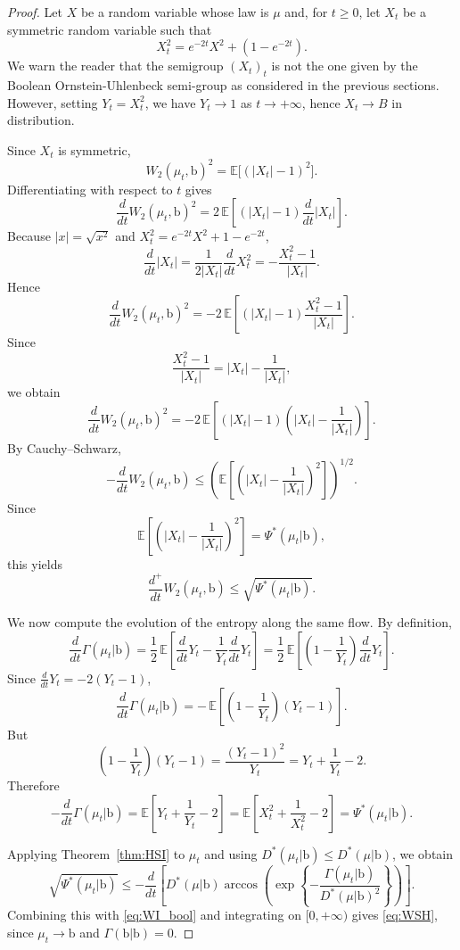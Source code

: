 \documentclass[10pt, reqno]{amsart}
\numberwithin{equation}{section}
\theoremstyle{definition}
\theoremstyle{plain}
\theoremstyle{remark}
\newcommand{\E}{\mathbb{E}}
\newcommand{\1}{\mathbbm{1}}
\begin{document}
\begin{proof}
Let $X$ be a random variable whose law is $\mu$ and, for $t\ge 0$, let $X_t$ be a symmetric random variable such that
\[
X_t^2 = e^{-2t}X^2+(1-e^{-2t}).
\]
We warn the reader that the semigroup $(X_t)_t$ is not the one given by the Boolean Ornstein-Uhlenbeck semi-group as considered in the previous sections.
However,  setting $Y_t=X_t^2$, we have $Y_t\to 1$ as $t\to+\infty$, hence
$X_t\to B$ in distribution.

Since $X_t$ is symmetric,
\[
W_2(\mu_t,\mathbb{\mathrm{b}})^2
=\E\big[(|X_t|-1)^2\big].
\]
Differentiating with respect to $t$ gives
\[
\frac{d}{dt}W_2(\mu_t,\mathbb{\mathrm{b}})^2
=
2\,\E\!\left[(|X_t|-1)\frac{d}{dt}|X_t|\right].
\]
Because $|x|=\sqrt{x^2}$ and $X_t^2=e^{-2t}X^2+1-e^{-2t}$,
\[
\frac{d}{dt}|X_t|
=
\frac{1}{2|X_t|}\frac{d}{dt}X_t^2
=
-\frac{X_t^2-1}{|X_t|}.
\]
Hence
\[
\frac{d}{dt}W_2(\mu_t,\mathbb{\mathrm{b}})^2
=
-2\,\E\!\left[(|X_t|-1)\frac{X_t^2-1}{|X_t|}\right].
\]
Since
\[
\frac{X_t^2-1}{|X_t|}
=
|X_t|-\frac1{|X_t|},
\]
we obtain
\[
\frac{d}{dt}W_2(\mu_t,\mathbb{\mathrm{b}})^2
=
-2\,\E\!\left[(|X_t|-1)\left(|X_t|-\frac1{|X_t|}\right)\right].
\]
By Cauchy--Schwarz,
\[
-\frac{d}{dt}W_2(\mu_t,\mathbb{\mathrm{b}})
\le
\left(
\E\!\left[\left(|X_t|-\frac1{|X_t|}\right)^2\right]
\right)^{1/2}.
\]
Since
\[
\E\!\left[\left(|X_t|-\frac1{|X_t|}\right)^2\right]
=\Psi^*(\mu_t|\mathbb{\mathrm{b}}),
\]
this yields
\begin{equation}\label{eq:WI_bool}
\frac{d^+}{dt}W_2(\mu_t,\mathbb{\mathrm{b}})
\le \sqrt{\Psi^*(\mu_t|\mathbb{\mathrm{b}})}.
\end{equation}

We now compute the evolution of the entropy along the same flow.  
By definition,
\[
\frac{d}{dt}\Gamma(\mu_t|\mathbb{\mathrm{b}})
=
\frac12\,\E\!\left[
\frac{d}{dt}Y_t
-
\frac{1}{Y_t}\frac{d}{dt}Y_t
\right]
=
\frac12\,\E\!\left[
\left(1-\frac1{Y_t}\right)\frac{d}{dt}Y_t
\right].
\]
Since $\frac{d}{dt}Y_t=-2(Y_t-1)$,
\[
\frac{d}{dt}\Gamma(\mu_t|\mathbb{\mathrm{b}})
=
-\,\E\!\left[
\left(1-\frac1{Y_t}\right)(Y_t-1)
\right].
\]
But
\[
\left(1-\frac1{Y_t}\right)(Y_t-1)
=
\frac{(Y_t-1)^2}{Y_t}
=
Y_t+\frac1{Y_t}-2.
\]
Therefore
\[
-\frac{d}{dt}\Gamma(\mu_t|\mathbb{\mathrm{b}})
=
\E\!\left[
Y_t+\frac1{Y_t}-2
\right]
=
\E\!\left[
X_t^2+\frac1{X_t^2}-2
\right]
=
\Psi^*(\mu_t|\mathbb{\mathrm{b}}).
\]

Applying Theorem~\ref{thm:HSI} to $\mu_t$ and using
$D^*(\mu_t|\mathbb{\mathrm{b}})\le D^*(\mu|\mathbb{\mathrm{b}})$, we obtain
\[
\sqrt{\Psi^*(\mu_t|\mathbb{\mathrm{b}})}
\le
-\frac{d}{dt}
\left[
D^*(\mu|\mathbb{\mathrm{b}})
\arccos\!\left(
\exp\!\left\{-\frac{\Gamma(\mu_t|\mathbb{\mathrm{b}})}{D^*(\mu|\mathbb{\mathrm{b}})^2}\right\}
\right)
\right].
\]
Combining this with \eqref{eq:WI_bool} and integrating on $[0,+\infty)$
gives \eqref{eq:WSH}, since $\mu_t\to\mathbb{\mathrm{b}}$ and
$\Gamma(\mathbb{\mathrm{b}}|\mathbb{\mathrm{b}})=0$.
\end{proof}
\end{document}

